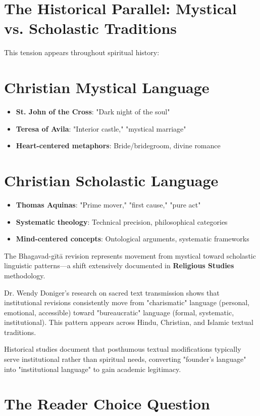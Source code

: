 \documentclass[11pt,twoside]{book}
\begin{document}
\section*{The Historical Parallel: Mystical vs. Scholastic Traditions}
\label{sec:org85922b6}

This tension appears throughout spiritual history:
\section*{Christian Mystical Language}
\label{sec:org2a44a44}
\begin{itemize}
\item \textbf{\textbf{St. John of the Cross}}: "Dark night of the soul"
\item \textbf{\textbf{Teresa of Avila}}: "Interior castle," "mystical marriage"
\item \textbf{\textbf{Heart-centered metaphors}}: Bride/bridegroom, divine romance
\end{itemize}
\section*{Christian Scholastic Language}
\label{sec:org198d550}
\begin{itemize}
\item \textbf{\textbf{Thomas Aquinas}}: "Prime mover," "first cause," "pure act"
\item \textbf{\textbf{Systematic theology}}: Technical precision, philosophical categories
\item \textbf{\textbf{Mind-centered concepts}}: Ontological arguments, systematic frameworks
\end{itemize}

The Bhagavad-gītā revision represents movement from mystical toward scholastic linguistic patterns—a shift extensively documented in \textbf{\textbf{Religious Studies}} methodology.

Dr. Wendy Doniger's research on sacred text transmission shows that institutional revisions consistently move from "charismatic" language (personal, emotional, accessible) toward "bureaucratic" language (formal, systematic, institutional). This pattern appears across Hindu, Christian, and Islamic textual traditions.

Historical studies document that posthumous textual modifications typically serve institutional rather than spiritual needs, converting "founder's language" into "institutional language" to gain academic legitimacy.
\section*{The Reader Choice Question}
\label{sec:orgbd7a1df}
\end{document}
